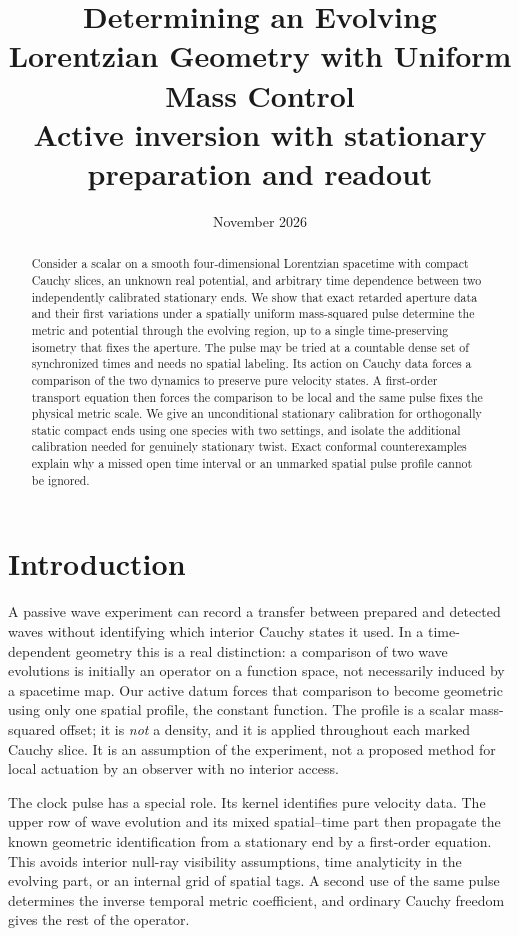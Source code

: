 \documentclass[11pt]{article}
\title{Determining an Evolving Lorentzian Geometry with Uniform Mass Control\\[3pt]
\large Active inversion with stationary preparation and readout}
\author{}
\date{November 2026}
\numberwithin{equation}{section}
\begin{document}
\maketitle
\begin{abstract}
Consider a scalar on a smooth four-dimensional Lorentzian spacetime with compact Cauchy slices, an unknown real potential, and arbitrary time dependence between two independently calibrated stationary ends. We show that exact retarded aperture data and their first variations under a spatially uniform mass-squared pulse determine the metric and potential through the evolving region, up to a single time-preserving isometry that fixes the aperture. The pulse may be tried at a countable dense set of synchronized times and needs no spatial labeling. Its action on Cauchy data forces a comparison of the two dynamics to preserve pure velocity states. A first-order transport equation then forces the comparison to be local and the same pulse fixes the physical metric scale. We give an unconditional stationary calibration for orthogonally static compact ends using one species with two settings, and isolate the additional calibration needed for genuinely stationary twist. Exact conformal counterexamples explain why a missed open time interval or an unmarked spatial pulse profile cannot be ignored.
\end{abstract}

\section{Introduction}

A passive wave experiment can record a transfer between prepared and detected waves without identifying which interior Cauchy states it used. In a time-dependent geometry this is a real distinction: a comparison of two wave evolutions is initially an operator on a function space, not necessarily induced by a spacetime map. Our active datum forces that comparison to become geometric using only one spatial profile, the constant function. The profile is a scalar mass-squared offset; it is \emph{not} a density, and it is applied throughout each marked Cauchy slice. It is an assumption of the experiment, not a proposed method for local actuation by an observer with no interior access.

The clock pulse has a special role. Its kernel identifies pure velocity data. The upper row of wave evolution and its mixed spatial--time part then propagate the known geometric identification from a stationary end by a first-order equation. This avoids interior null-ray visibility assumptions, time analyticity in the evolving part, or an internal grid of spatial tags. A second use of the same pulse determines the inverse temporal metric coefficient, and ordinary Cauchy freedom gives the rest of the operator.
\end{document}
